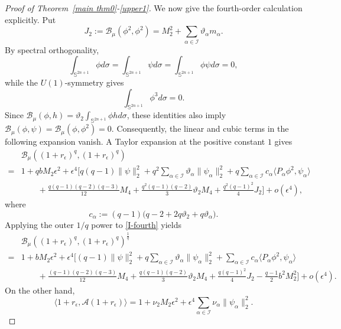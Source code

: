 \documentclass[10pt,a4paper]{amsart}
\begin{document}
\begin{proof}[Proof of Theorem~\ref{main thm0}-\eqref{upper1}]
We now give the fourth-order calculation explicitly. Put
{\begin{equation*}
 J_2:=\mathcal B_\mu(\phi^2,\phi^2)
 =M_2^2+\sum_{\alpha\in\mathcal I}\vartheta_\alpha m_\alpha.
\end{equation*}}
By spectral orthogonality,
\[
\int_{\mathbb S^{2n+1}}\phi d\sigma
=\int_{\mathbb S^{2n+1}}\psi d\sigma
=\int_{\mathbb S^{2n+1}}\phi\psi d\sigma=0,
\]
while the $U(1)$-symmetry gives
\[
\int_{\mathbb S^{2n+1}}\phi^3 d\sigma=0.
\]
Since $\mathcal B_\mu(\phi,h)
=\vartheta_2\int_{\mathbb S^{2n+1}}\phi h d\sigma$, these identities also imply
$\mathcal B_\mu(\phi,\psi)=\mathcal B_\mu(\phi,\phi^2)=0$.
Consequently, the linear and cubic terms in the following expansion vanish.
A Taylor expansion at the positive constant $1$ gives
\begin{align}\label{I-fourth}
 &{\mathcal B_\mu((1+r_\epsilon)^q,(1+r_\epsilon)^q)}\nonumber\\
 =&1+qbM_2\epsilon^2+\epsilon^4\Bigg[
 q(q-1)\|\psi\|_2^2+q^2\sum_{\alpha\in\mathcal I}\vartheta_\alpha\|\psi_\alpha\|_2^2
 +q\sum_{\alpha\in\mathcal I}c_\alpha\langle P_\alpha\phi^2,\psi_\alpha\rangle\nonumber\\
 &\qquad+\frac{q(q-1)(q-2)(q-3)}{12}M_4
 +\frac{q^2(q-1)(q-2)}3\vartheta_2M_4
 +\frac{q^2(q-1)^2}{4}J_2\Bigg]+o(\epsilon^4),
\end{align}
where
\begin{equation}\label{dc'-def}
 c_\alpha:=(q-1)\big(q-2+2q\vartheta_2+q\vartheta_\alpha\big).
\end{equation}
Applying the outer $1/q$ power to \eqref{I-fourth} yields
\begin{align}\label{outer-fourth}
 &{\mathcal B_\mu((1+r_\epsilon)^q,(1+r_\epsilon)^q)}^{\frac{1}{q}}\nonumber\\
 =&1+bM_2\epsilon^2+\epsilon^4\Bigg[
 (q-1)\|\psi\|_2^2+q\sum_{\alpha\in\mathcal I}\vartheta_\alpha\|\psi_\alpha\|_2^2
 +\sum_{\alpha\in\mathcal I}c_\alpha\langle P_\alpha\phi^2,\psi_\alpha\rangle\nonumber\\
 &\qquad+\frac{(q-1)(q-2)(q-3)}{12}M_4
 +\frac{q(q-1)(q-2)}3\vartheta_2M_4
 +\frac{q(q-1)^2}{4}J_2
 -\frac{q-1}{2}b^2M_2^2\Bigg]+o(\epsilon^4).
\end{align}
On the other hand,
\begin{equation}\label{energy-fourth}
 \langle1+r_\epsilon,\mathscr A(1+r_\epsilon)\rangle
 =1+\nu_2M_2\epsilon^2+\epsilon^4\sum_{\alpha\in\mathcal I}\nu_\alpha\|\psi_\alpha\|_2^2.
\end{equation}
\begingroup

\end{proof}
\end{document}
